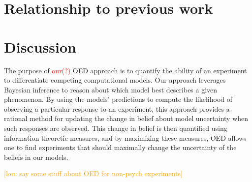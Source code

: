 \documentclass{article}
\newcommand{\red}[1]{\textcolor{Red}{#1}}
\newcommand{\lou}[1]{\textcolor{orange}{[lou: #1]}}
\begin{document}
\section{Relationship to previous work}
\section{Discussion}

The purpose of \red{our(?)} OED approach is to quantify the ability of an experiment to differentiate competing computational models. Our approach leverages Bayesian inference to reason about which model best describes a given phenomenon. By using the models' predictions to compute the likelihood of observing a particular response to an experiment, this approach provides a rational method for updating the change in belief about model uncertainty when such responses are observed. This change in belief is then quantified using information theoretic measures, and by maximizing these measures, OED allows one to find experiments that should maximally change the uncertainty of the beliefs in our models.

\lou{say some stuff about OED for non-psych experiments}

%
%
\end{document}
